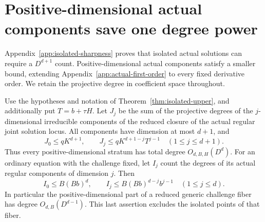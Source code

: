 \section{Positive-dimensional actual components save one degree power}
\label{app:higher-positive-components}

Appendix~\ref{app:isolated-sharpness} proves that isolated actual
solutions can require a $D^{d+1}$ count. Positive-dimensional actual
components satisfy a smaller bound, extending Appendix~\ref{app:actual-first-order}
to every fixed derivative order. We retain the projective degree in
coefficient space throughout.

\begin{theorem}
\label{thm:higher-actual-components}
Use the hypotheses and notation of Theorem~\ref{thm:isolated-upper},
and additionally put $T=b+\tau H$. Let $J_j$ be the sum of the
projective degrees of the $j$-dimensional irreducible components of
the reduced closure of the actual regular joint solution locus.
All components have dimension at most $d+1$, and
\[
 J_0\le qK^{d+1},\qquad
 J_j\le qK^{d+1-j}T^{j-1}\quad(1\le j\le d+1).
\]
Thus every positive-dimensional stratum has total degree
$O_{d,B,H}(D^d)$. For an ordinary equation with the challenge fixed,
let $I_j$ count the degrees of its actual regular components of
dimension $j$. Then
\[
 I_0\le B(Bb)^d,\qquad
 I_j\le B(Bb)^{d-j}b^{j-1}\quad(1\le j\le d).
\]
In particular the positive-dimensional part of a reduced generic
challenge fiber has degree $O_{d,B}(D^{d-1})$. This last assertion
excludes the isolated points of that fiber.
\end{theorem}
